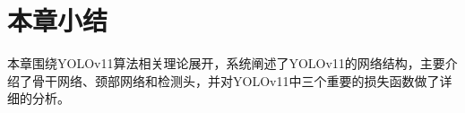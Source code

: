


\section{本章小结}
本章围绕YOLOv11算法相关理论展开，系统阐述了YOLOv11的网络结构，主要介绍了骨干网络、颈部网络和检测头，并对YOLOv11中三个重要的损失函数做了详细的分析。



